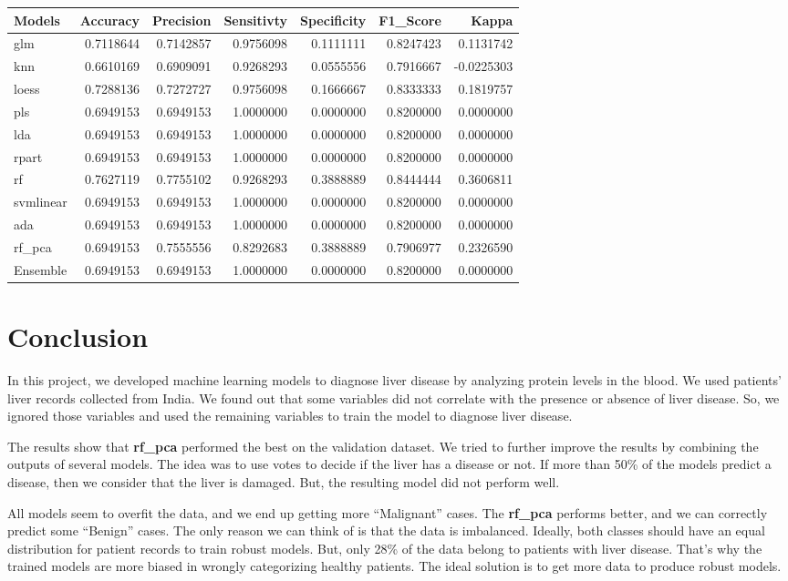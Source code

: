 \documentclass[]{article}
\begin{document}
\begin{longtable}[]{@{}lrrrrrr@{}}
\toprule
Models & Accuracy & Precision & Sensitivty & Specificity & F1\_Score &
Kappa\tabularnewline
\midrule
\endhead
glm & 0.7118644 & 0.7142857 & 0.9756098 & 0.1111111 & 0.8247423 &
0.1131742\tabularnewline
knn & 0.6610169 & 0.6909091 & 0.9268293 & 0.0555556 & 0.7916667 &
-0.0225303\tabularnewline
loess & 0.7288136 & 0.7272727 & 0.9756098 & 0.1666667 & 0.8333333 &
0.1819757\tabularnewline
pls & 0.6949153 & 0.6949153 & 1.0000000 & 0.0000000 & 0.8200000 &
0.0000000\tabularnewline
lda & 0.6949153 & 0.6949153 & 1.0000000 & 0.0000000 & 0.8200000 &
0.0000000\tabularnewline
rpart & 0.6949153 & 0.6949153 & 1.0000000 & 0.0000000 & 0.8200000 &
0.0000000\tabularnewline
rf & 0.7627119 & 0.7755102 & 0.9268293 & 0.3888889 & 0.8444444 &
0.3606811\tabularnewline
svmlinear & 0.6949153 & 0.6949153 & 1.0000000 & 0.0000000 & 0.8200000 &
0.0000000\tabularnewline
ada & 0.6949153 & 0.6949153 & 1.0000000 & 0.0000000 & 0.8200000 &
0.0000000\tabularnewline
rf\_pca & 0.6949153 & 0.7555556 & 0.8292683 & 0.3888889 & 0.7906977 &
0.2326590\tabularnewline
Ensemble & 0.6949153 & 0.6949153 & 1.0000000 & 0.0000000 & 0.8200000 &
0.0000000\tabularnewline
\bottomrule
\end{longtable}

\section{Conclusion}
\label{sec:conclusion}

In this project, we developed machine learning models to diagnose liver
disease by analyzing protein levels in the blood. We used patients'
liver records collected from India. We found out that some variables did
not correlate with the presence or absence of liver disease. So, we
ignored those variables and used the remaining variables to train the
model to diagnose liver disease.

The results show that \textbf{rf\_pca} performed the best on the
validation dataset. We tried to further improve the results by combining
the outputs of several models. The idea was to use votes to decide if
the liver has a disease or not. If more than 50\% of the models predict
a disease, then we consider that the liver is damaged. But, the
resulting model did not perform well.

All models seem to overfit the data, and we end up getting more
``Malignant'' cases. The \textbf{rf\_pca} performs better,
and we can correctly predict some ``Benign'' cases. The only reason we
can think of is that the data is imbalanced. Ideally, both classes
should have an equal distribution for patient records to train robust
models. But, only 28\% of the data belong to patients with liver
disease. That's why the trained models are more biased in wrongly
categorizing healthy patients. The ideal solution is to get more data to
produce robust models.
\end{document}

